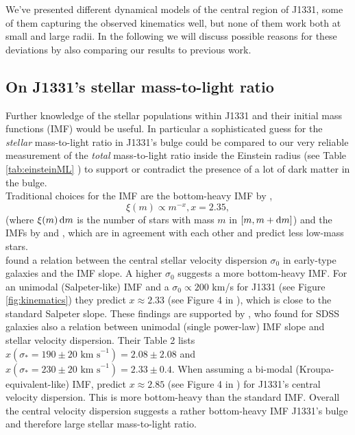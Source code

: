 We've presented different dynamical models of the central region of J1331, some of them capturing the observed kinematics well, but none of them work both at small and large radii. In the following we will discuss possible reasons for these deviations by also comparing our results to previous work.

\subsection{On J1331's stellar mass-to-light ratio} \label{sec:MLdiscussion}

Further knowledge of the stellar populations within J1331 and their initial mass functions (IMF) would be useful. In particular a sophisticated guess for the \emph{stellar} mass-to-light ratio in J1331's bulge could be compared to our very reliable measurement of the \emph{total} mass-to-light ratio inside the Einstein radius (see Table \ref{tab:einsteinML} ) to support or contradict the presence of a lot of dark matter in the bulge. \\

Traditional choices for the IMF are the bottom-heavy IMF by \citet{Salpeter1955},
$$\xi(m) \propto m^{-x}, x=2.35,$$
(where $\xi(m) \mathop{}\!\mathrm{d} m$ is the number of stars with mass $m$ in $[m,m+\mathop{}\!\mathrm{d} m]$) and the IMFs by \citet{2002Sci...295...82K} and \citet{Chabrier2003}, which are in agreement with each other and predict less low-mass stars. \\

\citet{Ferreras} found a relation between the central stellar velocity dispersion $\sigma_0$ in early-type galaxies and the IMF slope. A higher $\sigma_0$ suggests a more bottom-heavy IMF. For an unimodal (Salpeter-like) IMF and a $\sigma_0 \propto 200 $ km/s for J1331 (see Figure \ref{fig:kinematics}) they predict $x \approx 2.33$ (see Figure 4 in \citet{Ferreras}), which is close to the standard Salpeter slope. These findings are supported by \citet{2014MNRAS.438.1483S}, who found for SDSS galaxies also a relation between unimodal (single power-law) IMF slope and stellar velocity dispersion. Their Table 2 lists $x(\sigma_*=190 \pm 20 \text{ km s}^{-1}) = 2.08 \pm 2.08$ and $x(\sigma_*= 230 \pm 20 \text{ km s}^{-1}) = 2.33 \pm 0.4$. When assuming a bi-modal (Kroupa-equivalent-like) IMF, \citet{Ferreras} predict $x \approx 2.85$ (see Figure 4 in \citet{Ferreras}) for J1331's central velocity dispersion. This is more bottom-heavy than the standard \citet{2002Sci...295...82K} IMF. Overall the central velocity dispersion suggests a rather bottom-heavy IMF J1331's bulge and therefore large stellar mass-to-light ratio.\\

